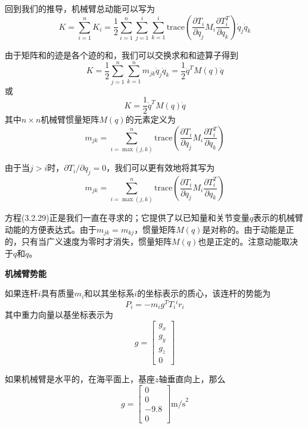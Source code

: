 \documentclass[12pt,a4paper]{ctexart}
\begin{document}
回到我们的推导，机械臂总动能可以写为
\begin{equation}
K = \sum_{i=1}^{n}K_i = \frac{1}{2}\sum_{i=1}^{n}\sum_{j=1}^{i}\sum_{k=1}^{i}\text{trace}\left(\frac{\partial T_i}{\partial q_j}M_i\frac{\partial T_i^T}{\partial q_k}\right)\dot{q}_j\dot{q}_k
\end{equation}

由于矩阵和的迹是各个迹的和，我们可以交换求和和迹算子得到
\begin{equation}
K = \frac{1}{2}\sum_{j=1}^{n}\sum_{k=1}^{n}m_{jk}\dot{q}_j\dot{q}_k = \frac{1}{2}\dot{q}^T M(q) \dot{q}
\end{equation}
或
\begin{equation}
K = \frac{1}{2}\dot{q}^T M(q) \dot{q}
\end{equation}
其中$n \times n$机械臂惯量矩阵$M(q)$的元素定义为
\begin{equation}
m_{jk} = \sum_{i=\max(j,k)}^{n}\text{trace}\left(\frac{\partial T_i}{\partial q_j}M_i\frac{\partial T_i^T}{\partial q_k}\right)
\end{equation}

由于当$j > i$时，$\partial T_i/\partial q_j = 0$，我们可以更有效地将其写为
\begin{equation}
m_{jk} = \sum_{i=\max(j,k)}^{n}\text{trace}\left(\frac{\partial T_i}{\partial q_j}M_i\frac{\partial T_i^T}{\partial q_k}\right)
\end{equation}

方程(3.2.29)正是我们一直在寻求的；它提供了以已知量和关节变量$q$表示的机械臂动能的方便表达式。由于$m_{jk} = m_{kj}$，惯量矩阵$M(q)$是对称的。由于动能是正的，只有当广义速度为零时才消失，惯量矩阵$M(q)$也是正定的。注意动能取决于$q$和$\dot{q}$。

\textbf{机械臂势能}

如果连杆$i$具有质量$m_i$和以其坐标系$i$的坐标表示的质心，该连杆的势能为
\begin{equation}
P_i = -m_i g^T T_i {^ir_i}
\end{equation}
其中重力向量以基坐标表示为
\begin{equation}
g = \begin{bmatrix} g_x \\ g_y \\ g_z \\ 0 \end{bmatrix}
\end{equation}

如果机械臂是水平的，在海平面上，基座$z$轴垂直向上，那么
\begin{equation}
g = \begin{bmatrix} 0 \\ 0 \\ -9.8 \\ 0 \end{bmatrix} \text{m/s}^2
\end{equation}
\end{document}
